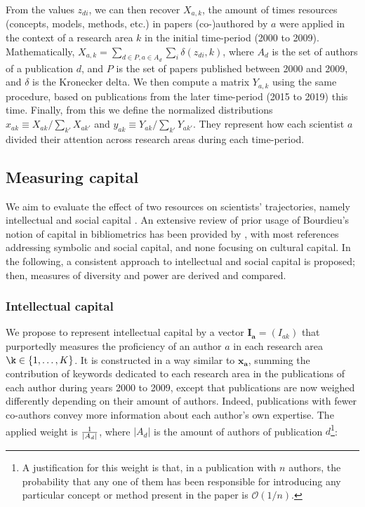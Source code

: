 \documentclass{article}
\begin{document}
From the values $z_{di}$, we can then recover $X_{a,k}$, the amount of times resources (concepts, models, methods, etc.) in papers (co-)authored by $a$ were applied in the context of a research area $k$ in the initial time-period (2000 to 2009). Mathematically, $X_{a,k}=\sum_{d\in P,a\in A_d} \sum_i \delta(z_{di},k)$, where $A_d$ is the set of authors of a publication $d$, and $P$ is the set of papers published between 2000 and 2009, and $\delta$ is the Kronecker delta. We then compute a matrix $Y_{a,k}$ using the same procedure, based on publications from the later time-period (2015 to 2019) this time. Finally, from this we define the normalized distributions $x_{ak} \equiv X_{ak}/\sum_{k'} X_{ak'}$ and $y_{ak} \equiv Y_{ak}/\sum_{k'} Y_{ak'}$. They represent how each scientist $a$ divided their attention across research areas during each time-period.

\subsection{\label{sec:capital}Measuring capital}

We aim to evaluate the effect of two resources on scientists' trajectories, namely intellectual and social capital \citep{Bourdieu1986}. An extensive review of prior usage of Bourdieu's notion of capital in bibliometrics has been provided by \citet[p.~198-200]{Schirone2023}, with most references addressing symbolic and social capital, and none focusing on cultural capital. In the following, a consistent approach to intellectual and social capital is proposed; then, measures of diversity and power are derived and compared.

\subsubsection{Intellectual capital}

We propose to represent intellectual capital by a vector $\bm{I_a}=(I_{ak})$ that purportedly measures the proficiency of an author $a$ in each research area $\k \in \{1,\dots,K\}$. It is constructed in a way similar to $\bm{x_{a}}$, summing the contribution of keywords dedicated to each research area in the publications of each author during years 2000 to 2009, except that publications are now weighed differently depending on their amount of authors. Indeed, publications with fewer co-authors convey more information about each author's own expertise. The applied weight is $1 \over |A_d|$, where $|A_d|$ is the amount of authors of publication $d$\footnote{A justification for this weight is that, in a publication with $n$ authors, the probability that any one of them has been responsible for introducing any particular concept or method present in the paper is $\mathcal{O}(1/n)$. }:
\end{document}
